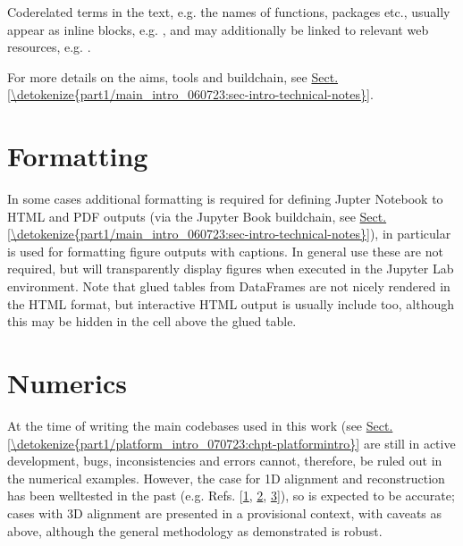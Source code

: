\documentclass[letterpaper,table,10pt,english]{jupyterBook}
\begin{document}
\sphinxAtStartPar
Code\sphinxhyphen{}related terms in the text, e.g. the names of functions, packages etc., usually appear as in\sphinxhyphen{}line blocks, e.g. , and may additionally be linked to relevant web resources, e.g. .

\sphinxAtStartPar
For more details on the aims, tools and build\sphinxhyphen{}chain, see \hyperref[\detokenize{part1/main_intro_060723:sec-intro-technical-notes}]{Sect.\@ \ref{\detokenize{part1/main_intro_060723:sec-intro-technical-notes}}}.


\section{Formatting}
\label{\detokenize{frontmatter/book_versions_note:formatting}}
\sphinxAtStartPar
In some cases additional formatting is required for defining Jupter Notebook to HTML and PDF outputs (via the Jupyter Book build\sphinxhyphen{}chain, see \hyperref[\detokenize{part1/main_intro_060723:sec-intro-technical-notes}]{Sect.\@ \ref{\detokenize{part1/main_intro_060723:sec-intro-technical-notes}}}), in particular  is used for formatting figure outputs with captions. In general use these are not required, but will transparently display figures when executed in the Jupyter Lab environment. Note that glued tables from  DataFrames are not nicely rendered in the HTML format, but interactive HTML output is usually include too, although this may be hidden in the cell above the glued table.


\section{Numerics}
\label{\detokenize{frontmatter/book_versions_note:numerics}}\label{\detokenize{frontmatter/book_versions_note:sec-numerics-disclaimer}}
\sphinxAtStartPar
At the time of writing the main code\sphinxhyphen{}bases used in this work (see \hyperref[\detokenize{part1/platform_intro_070723:chpt-platformintro}]{Sect.\@ \ref{\detokenize{part1/platform_intro_070723:chpt-platformintro}}} are still in active development, bugs, inconsistencies and errors cannot, therefore, be ruled out in the numerical examples. However, the case for 1D alignment and reconstruction has been well\sphinxhyphen{}tested in the past (e.g. Refs. {[}\hyperlink{cite.backmatter/bibliography:id776}{1}, \hyperlink{cite.backmatter/bibliography:id684}{2}, \hyperlink{cite.backmatter/bibliography:id686}{3}{]}), so is expected to be accurate; cases with 3D alignment are presented in a provisional context, with caveats as above, although the general methodology as demonstrated is robust.
\end{document}
